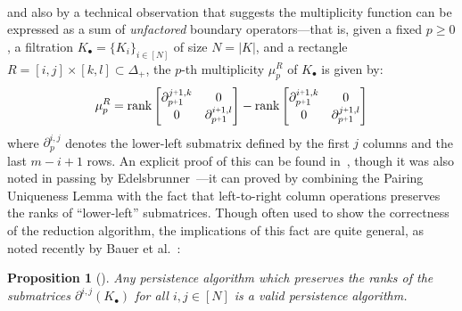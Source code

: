 \documentclass[10pt twocolumn]{article}
\numberwithin{equation}{section}
\newcommand{\+}{%
	\raisebox{0.18ex}{\scaleobj{0.55}{+}}
}
\newtheorem{proposition}{Proposition}
\theoremstyle{definition}
\theoremstyle{definition}
\begin{document}
\begin{multicols}{2}
\begin{multline*}
\end{multline*}
and also by a technical observation that suggests the multiplicity function can be expressed as a sum of \emph{unfactored} boundary operators---that is, given a fixed $p \geq 0$, a filtration $K_\bullet = \{K_i\}_{i\in [N]}$ of size $N = \lvert K \rvert$, and a rectangle $R = [i,j] \times [k,l] \subset \Delta_+$, the $p$-th multiplicity $\mu_p^{R}$ of $K_\bullet$ is given by:
	\begin{equation*}
	\mu_p^{R} = 
	\mathrm{rank}\begin{bmatrix} \partial_{p\+1}^{j \+ 1, k} & 0 \\
	0 & \partial_{p\+1}^{i \+ 1, l}
	\end{bmatrix}
	- 
	\mathrm{rank}\begin{bmatrix} \partial_{p\+1}^{i \+ 1, k} & 0 \\
	0 & \partial_{p\+1}^{j \+ 1, l}
	\end{bmatrix}
	\end{equation*}
\noindent 
where $\partial_p^{i, j}$ denotes the lower-left submatrix defined by the first $j$ columns and the last $m - i + 1$ rows.
An explicit proof of this can be found in~\cite{dey2022computational}, though it was also noted in passing by Edelsbrunner~\cite{edelsbrunner2000topological}---it can proved by combining the Pairing Uniqueness Lemma with the fact that left-to-right column operations preserves the ranks of ``lower-left'' submatrices.
Though often used to show the correctness of the reduction algorithm, the implications of this fact are quite general, as noted recently by Bauer et al.~\cite{bauer2022keeping}:
\begin{proposition}[\cite{bauer2022keeping}]\label{prop:bauer}
	Any persistence algorithm which preserves the ranks of the submatrices $\partial^{i,j}(K_\bullet)$ for all $i,j \in [N]$ is a valid persistence algorithm. 
\end{proposition}
\end{multicols}
\end{document}
